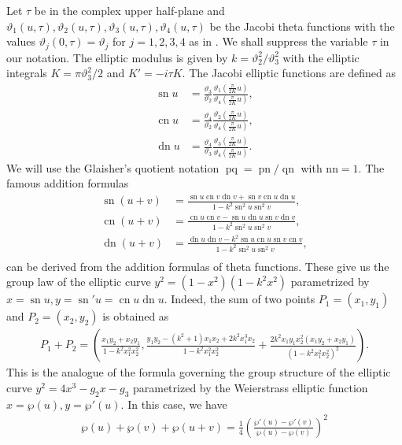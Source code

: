 \documentclass{amsart}
\theoremstyle{definition}
\DeclareMathOperator{\dn}{dn}
\DeclareMathOperator{\sn}{sn}
\DeclareMathOperator{\cn}{cn}
\DeclareMathOperator{\pq}{pq}
\DeclareMathOperator{\pn}{pn}
\DeclareMathOperator{\qn}{qn}
\begin{document}
Let $\tau$ be in the complex upper half-plane and $\vartheta_1(u,\tau),\vartheta_2(u,\tau),\vartheta_3(u,\tau),\vartheta_4(u,\tau)$ be the Jacobi theta functions with the values $\vartheta_j(0,\tau)=\vartheta_j$ for $j=1,2,3,4$ as in \cite{Whittakter}. We shall suppress the variable $\tau$ in our notation. The elliptic modulus is given by $k=\vartheta_2^2/\vartheta_3^2$ with the elliptic integrals $K=\pi \vartheta_3^2/2$ and $K'=-i\tau K$. The Jacobi elliptic functions are defined as
\begin{align*}
    \sn u&=\frac{\vartheta_3}{\vartheta_2}\frac{\vartheta_1\left( \frac{\pi}{2K}u \right)}{\vartheta_4\left( \frac{\pi}{2K}u \right)},\\
    \cn u&=\frac{\vartheta_4}{\vartheta_2}\frac{\vartheta_2\left( \frac{\pi}{2K}u \right)}{\vartheta_4\left( \frac{\pi}{2K}u \right)},\\
    \dn u&=\frac{\vartheta_4}{\vartheta_3}\frac{\vartheta_3\left( \frac{\pi}{2K}u \right)}{\vartheta_4\left( \frac{\pi}{2K}u \right)}.
\end{align*}
We will use the Glaisher's quotient notation $\pq=\pn/\qn$ with $\text{nn}=1$. The famous addition formulas
\begin{align*}
    \sn(u+v)&=\frac{\sn u\cn v\dn v+\sn v \cn u \dn u}{1-k^2 \sn^2u \sn^2 v},\\
\cn(u+v)&=\frac{\cn u\cn v-\sn u\dn u \sn v \dn v}{1-k^2 \sn^2u \sn^2 v},\\
\dn(u+v)&=\frac{\dn u \dn v-k^2\sn u \cn u \sn v \cn v}{1-k^2 \sn^2u \sn^2 v},\\
\end{align*}
can be derived from the addition formulas of theta functions. These give us the group law of the elliptic curve $y^2=\left(1-x^2\right)\left(1-k^2x^2\right)$ parametrized by $x=\sn u, y=\sn'u=\cn u \dn u$. Indeed, the sum of two points $P_1=(x_1,y_1)$ and $P_2=(x_2,y_2)$ is obtained as \cite{dlmf}
\begin{align*}
    P_1+P_2=\left( \frac{x_1y_2+x_2y_1}{1-k^2x_1^2x_2^2} ,\frac{y_1y_2-\left(k^2+1\right)x_1x_2+2k^2x_1^3x_2}{1-k^2x_1^2x_2^2}+\frac{2k^2x_1y_1x_2^2(x_1y_2+x_2y_1)}{\left( 1-k^2x_1^2x_2^2 \right)^2}\right).
\end{align*}
This is the analogue of the formula governing the group structure of the elliptic curve $y^2=4x^3-g_2x-g_3$ parametrized by the Weierstrass elliptic function $x=\wp(u),y=\wp'(u)$. In this case, we have
\begin{align*}
    \wp(u)+\wp(v)+\wp(u+v)=\frac{1}{4}\left( \frac{\wp'(u)-\wp'(v)}{\wp(u)-\wp(v)} \right)^2
\end{align*}
\end{document}
